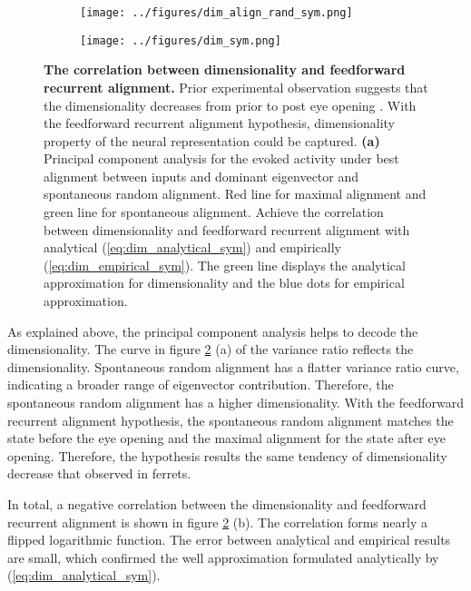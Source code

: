 \documentclass[11pt]{article}
\begin{document}
		\begin{figure}[H] 
			\centering
			\begin{subfigure}[b]{0.45\textwidth} 
				\texttt{[image: ../figures/dim\_align\_rand\_sym.png]}
				\caption{}
			\end{subfigure}
			\begin{subfigure}[b]{0.45\textwidth}
				\texttt{[image: ../figures/dim\_sym.png]}
				\caption{}
				\label{fig:dim_sym}
			\end{subfigure}
			\vspace{-0.2cm}
			\caption{\textbf{The correlation between dimensionality and feedforward recurrent alignment.} Prior experimental observation suggests that the dimensionality decreases from prior to post eye opening \cite{tragenap2023nature}. With the feedforward recurrent alignment hypothesis, dimensionality property of the neural representation could be captured. \textbf{(a)} Principal component analysis for the evoked activity under best alignment between inputs and dominant eigenvector and spontaneous random alignment. Red line for maximal alignment and green line for spontaneous alignment.  Achieve the correlation between dimensionality and feedforward recurrent alignment with analytical (\ref{eq:dim_analytical_sym}) and empirically (\ref{eq:dim_empirical_sym}). The green line displays the analytical approximation for dimensionality and the blue dots for empirical approximation.} 
			\label{fig:correlation_dim_ffrec_sym}
		\end{figure}
	\vspace{-0.2cm}
	As explained above, the principal component analysis helps to decode the dimensionality. The curve in figure \ref{fig:correlation_dim_ffrec_sym} (a) of the variance ratio reflects the dimensionality. Spontaneous random alignment has a flatter variance ratio curve, indicating a broader range of eigenvector contribution. Therefore, the spontaneous random alignment has a higher dimensionality. With the feedforward recurrent alignment hypothesis, the spontaneous random alignment matches the state before the eye opening and the maximal alignment for the state after eye opening. Therefore, the hypothesis results the same tendency of dimensionality decrease that observed in ferrets\cite{tragenap2023nature}.
	
	In total, a negative correlation between the dimensionality and feedforward recurrent alignment is shown in figure \ref{fig:correlation_dim_ffrec_sym} (b). The correlation forms nearly a flipped logarithmic function. The error between analytical and empirical results are small, which confirmed the well approximation formulated analytically by (\ref{eq:dim_analytical_sym}). 
	
\end{document}

